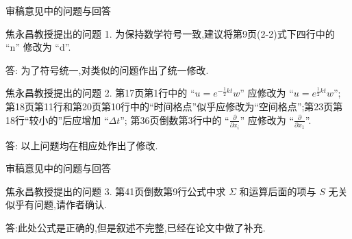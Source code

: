 \documentclass{beamer}
\begin{document}
\begin{frame}{审稿意见中的问题与回答}
\begin{block}{焦永昌教授提出的问题}
1. 为保持数学符号一致,建议将第9页(2-2)式下四行中的 ``n'' 修改为 ``d''.
\end{block}
答: 为了符号统一,对类似的问题作出了统一修改.

\begin{block}{焦永昌教授提出的问题}
2. 第17页第1行中的 ``$u=e^{-\frac{1}{2}kt}w$'' 应修改为 ``$u=e^{\frac{1}{2}kt}w$''; 第18页第11行和第20页第10行中的``时间格点''似乎应修改为``空间格点'';第23页第18行``较小的''后应增加 ``$\Delta t$''; 第36页倒数第3行中的 ``$\frac{\partial}{\partial x_i}$'' 应修改为 ``$\frac{\partial}{\partial x_1}$''.
\end{block}
答: 以上问题均在相应处作出了修改.
\end{frame}

\begin{frame}{审稿意见中的问题与回答}
\begin{block}{焦永昌教授提出的问题}
3. 第41页倒数第9行公式中求 $\Sigma$ 和运算后面的项与 $S$ 无关似乎有问题,请作者确认.
\end{block}
答:此处公式是正确的,但是叙述不完整,已经在论文中做了补充.
\end{frame}

%
%
%
%
%
\end{document}

